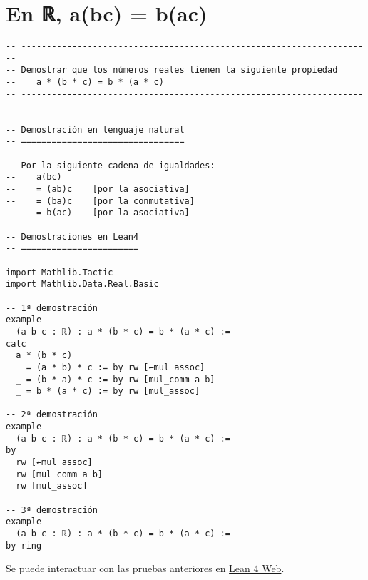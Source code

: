 \section{En ℝ, a(bc) = b(ac)}
\label{sec:orgb4f58e1}
\begin{verbatim}
-- ---------------------------------------------------------------------
-- Demostrar que los números reales tienen la siguiente propiedad
--    a * (b * c) = b * (a * c)
-- ---------------------------------------------------------------------

-- Demostración en lenguaje natural
-- ================================

-- Por la siguiente cadena de igualdades:
--    a(bc)
--    = (ab)c    [por la asociativa]
--    = (ba)c    [por la conmutativa]
--    = b(ac)    [por la asociativa]

-- Demostraciones en Lean4
-- =======================

import Mathlib.Tactic
import Mathlib.Data.Real.Basic

-- 1ª demostración
example
  (a b c : ℝ) : a * (b * c) = b * (a * c) :=
calc
  a * (b * c)
    = (a * b) * c := by rw [←mul_assoc]
  _ = (b * a) * c := by rw [mul_comm a b]
  _ = b * (a * c) := by rw [mul_assoc]

-- 2ª demostración
example
  (a b c : ℝ) : a * (b * c) = b * (a * c) :=
by
  rw [←mul_assoc]
  rw [mul_comm a b]
  rw [mul_assoc]

-- 3ª demostración
example
  (a b c : ℝ) : a * (b * c) = b * (a * c) :=
by ring
\end{verbatim}
Se puede interactuar con las pruebas anteriores en \href{https://lean.math.hhu.de/\#url=https://raw.githubusercontent.com/jaalonso/Calculemus2/main/src/a(bc)\_eq\_b(ac).lean}{Lean 4 Web}.

